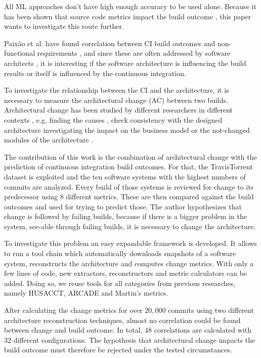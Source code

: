 \documentclass[conference]{IEEEtran}
\begin{document}
All ML approaches don't have high enough accuracy to be used alone. Because it has been shown that source code metrics impact the build outcome \cite{FailsCorr}, this paper wants to investigate this route further. 

Paixão et al. have found correlation between CI build outcomes and non-functional requirements \cite{Fail-NFReq}, and since these are often addressed by software architects \cite{NFR-Architects}, it is interesting if the software architecture is influencing the build results or itself is influenced by the continuous integration. 

To investigate the relationship between the CI and the architecture, it is necessary to measure the architectural change (AC) between two builds. Architectural change has been studied by different researchers in different contexts \cite{Aramis,StructDist,Arc-MDSE,Arcade-Base} , e.g.  finding the causes \cite{AC-Causes}, check consistency with the designed architecture \cite{ArcConf, ArcCons} investigating the impact on the business model \cite{ArcChange-Business} or the not-changed modules of the architecture \cite{Knowledge-AC}. 

The contribution of this work is the combination of architectural change with the prediction of continuous integration build outcomes. For that, the TravisTorrent dataset is exploited and the ten software systems with the highest numbers of commits are analyzed. Every build of those systems is reviewed for change to its predecessor using 8 different metrics. These are then compared against the build outcomes and used for trying to predict those. The author hypothesizes that change is followed by failing builds, because if there is a bigger problem in the system, see-able through failing builds, it is necessary to change the architecture. 

To investigate this problem an easy expandable framework is developed. It allows to run a tool chain which automatically downloads snapshots of a software system, reconstructs the architecture and computes change metrics. With only a few lines of code, new extractors, reconstructors and metric calculators can be added. Doing so, we reuse tools for all categories from previous researches, namely HUSACCT, ARCADE and Martin's metrics.

After calculating the change metrics for over $20,000$ commits using two different architecture reconstruction techniques, almost no correlation could be found between change and build outcome. In total, $48$ correlations are calculated with $32$ different configurations. The hypothesis that architectural change impacts the build outcome must therefore be rejected under the tested circumstances. 
\end{document}
